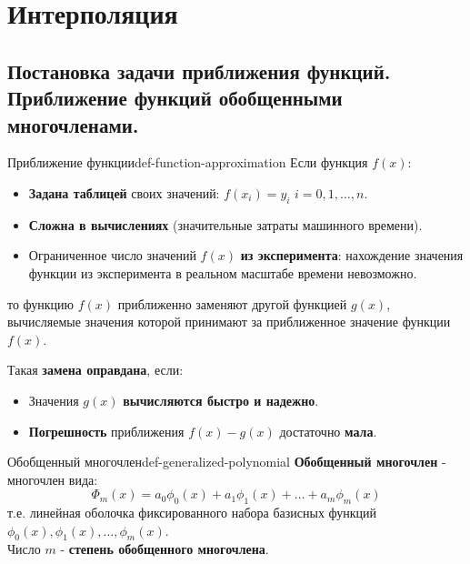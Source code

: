 \documentclass[14pt]{extarticle}
\begin{document}
\section{Интерполяция}

\subsection{Постановка задачи приближения функций. Приближение функций обобщенными многочленами.}

    \begin{definition}{Приближение функции}{def-function-approximation}
        Если функция $f(x)$:
        \begin{itemize}
            \item \textbf{Задана таблицей} своих значений: $f(x_{i}) = y_{i}$ $i = 0, 1, \ldots, n$.
            \item \textbf{Сложна в вычислениях} (значительные затраты машинного времени).
            \item Ограниченное число значений $f(x)$ \textbf{из эксперимента}: нахождение значения функции из эксперимента в реальном масштабе времени невозможно.
        \end{itemize}
        то функцию $f(x)$ приближенно заменяют другой функцией $g(x)$, вычисляемые значения которой принимают за приближенное значение функции $f(x)$.

        \vspace{\baselineskip}

        Такая \textbf{замена оправдана}, если:
        \begin{itemize}
            \item Значения $g(x)$ \textbf{вычисляются быстро и надежно}.
            \item \textbf{Погрешность} приближения $f(x) - g(x)$ достаточно \textbf{мала}.
        \end{itemize}
    \end{definition}

    \begin{definition}{Обобщенный многочлен}{def-generalized-polynomial}
        \textbf{Обобщенный многочлен} - многочлен вида:
        $$\Phi_{m}(x) = a_{0}\phi_{0}(x) + a_{1}\phi_{1}(x) + \ldots + a_{m}\phi_{m}(x)$$
        т.е. линейная оболочка фиксированного набора базисных функций $\phi_{0}(x), \phi_{1}(x), \ldots, \phi_{m}(x)$.\\
    
        Число $m$ - \textbf{степень обобщенного многочлена}.
    \end{definition}
\end{document}
